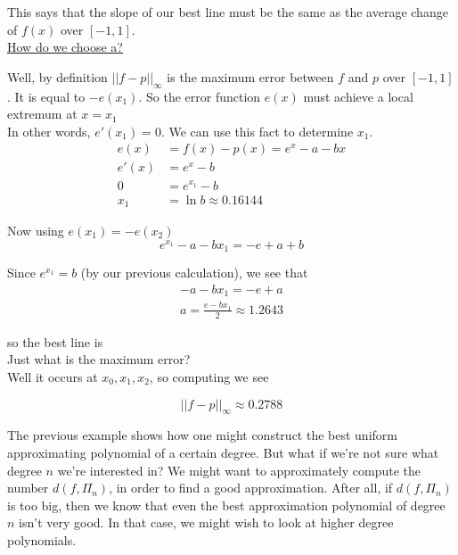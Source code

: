 {This says that the slope of our best line must be the same as the average change of $f(x)$ over $[-1,1]$. \\

\underline{How do we choose a?}

Well, by definition $||f - p||_\infty$ is the maximum error between $f$ and $p$ over $[-1,1]$. It is equal to $-e(x_1)$. So the error function $e(x)$ must achieve a local extremum at $x = x_1$ \\

In other words, $e'(x_1) = 0$. We can use this fact to determine $x_1$.
\begin{align*}
    e(x) &= f(x) - p(x) = e^x - a - bx \\
    e'(x) &= e^x - b \\
    0 &= e^{x_1} - b \\
    x_1 &= \ln{b} \approx 0.16144
\end{align*}

Now using $e(x_1) = -e(x_2)$
\begin{equation*}
    e^{x_1} - a - bx_1 = -e + a + b
\end{equation*}

Since $e^{x_1} = b$ (by our previous calculation), we see that
\begin{align*}
    -a - bx_1 = -e +a \\
    a = \frac{e - bx_1}{2} \approx 1.2643
\end{align*}

so the best line is  \\

Just what is the maximum error? \\

Well it occurs at $x_0, x_1, x_2$, so computing we see 

\begin{equation*}
    \boxed{||f - p||_\infty \approx 0.2788}
\end{equation*}

The previous example shows how one might construct the best uniform approximating polynomial of a certain degree. But what if we're not sure what degree $n$ we're interested in? We might want to approximately compute the number $d(f, \Pi_n)$, in order to find a good approximation. After all, if $d(f, \Pi_n)$ is too big, then we know that even the best approximation polynomial of degree $n$ isn't very good. In that case, we might wish to look at higher degree polynomials. \\

}
